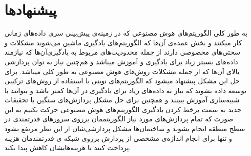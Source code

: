 \section{پیشنهادها}
    به طور کلی الگوریتم‌های هوش‌ مصنوعی که در زمینه‌ی پیش‌بینی سری داده‌های زمانی کار میکنند و بخش عمده‌ی آن‌ها که الگوریتم‌های یادگیری ماشین می‌شوند مشکلات و سختی‌های مخصوصی دارند
    از جمله محدودیت‌های مربوط به یادگیری‌آن‌ها که نیازمند داده‌های بسیتر زیاد برای یادگیری و آموزش میباشد و هم‌چنین نیاز به توان پردازشی بالای آن‌ها که از جمله مشکلات روش‌های هوش مصنوعی 
    به طور کلی میباشد. 
    برای حل این مشکل پیشنهاد میشود که الگوریتم‌های نوینی با استفاده از روش‌های ترکیبی توسعه داده بشوند که نیاز به داده‌های زیاد برای یادگیری در آن‌ها کمتر باشد و بتوانند با شبیه‌سازی 
    آموزش ببینند و همچنین برای حل مشکل پردازش‌های سنگین با تحقیقات جدید به سمت برخط کردن یادگیری الگوریتم‌های هوش مصنوعی حرکت بکنیم به این صورت که تمام پردازش‌های مورد نیاز 
    الگوریتممان برروی سرورهای قدرتمندی در سطح منطقه انجام بشوند و ساختمان‌ها مشکل پردازشی‌شان از این نظر مرتفع بشود و تنها برای انجام اندازه‌ی مشخصی از پردازش برروی شبکه ی قدرتمندمان 
    هزینه پرداخت کنند تا هزینه‌هایشان کاهش پیدا بکند.
